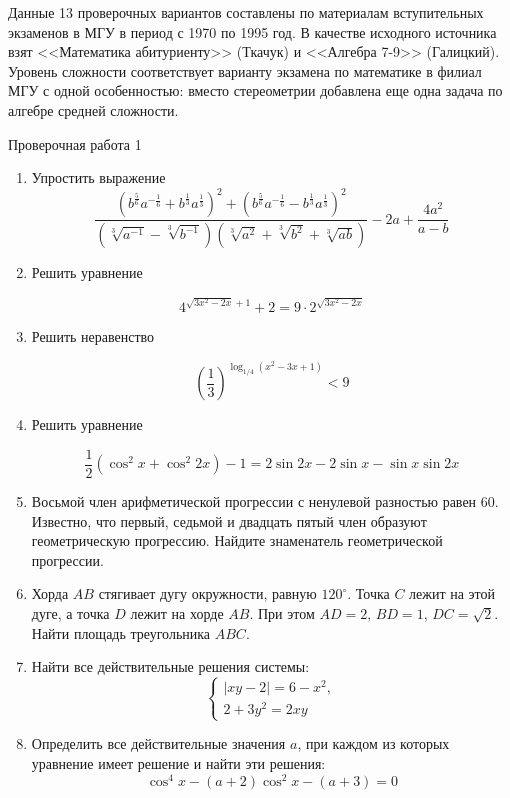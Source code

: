 \documentclass[11pt,a5paper]{report}
\begin{document}
Данные 13 проверочных вариантов составлены по материалам вступительных экзаменов в МГУ в период с 1970 по 1995 год. В качестве исходного источника взят <<Математика абитуриенту>> (Ткачук) и <<Алгебра 7-9>> (Галицкий). Уровень сложности соответствует варианту экзамена по математике в филиал МГУ с одной особенностью: вместо стереометрии добавлена еще одна задача по алгебре средней сложности.

\newpage

\begin{center}
Проверочная работа 1
\end{center}

\begin{enumerate}
\item Упростить выражение
$$
\frac{\left(b^{\frac{5}{6}} a^{-\frac{1}{6}} + b^{\frac{1}{3}} a^{\frac{1}{3}}\right)^2 + \left(b^{\frac{5}{6}} a^{-\frac{1}{6}} - b^{\frac{1}{3}} a^{\frac{1}{3}}\right)^2}
{(\sqrt[3]{a^{-1}} - \sqrt[3]{b^{-1}}) (\sqrt[3]{a^2} + \sqrt[3]{b^2} + \sqrt[3]{ab})} - 2a + \frac{4a^2}{a-b}
$$

\item Решить уравнение

$$ 4^{\sqrt{3x^2 - 2x} + 1} + 2 = 9 \cdot 2^{\sqrt{3x^2 - 2x}}$$

\item Решить неравенство

$$ \left( \frac{1}{3} \right)^{\log_{1/4} (x^2 - 3x + 1)} < 9 $$

\item Решить уравнение

$$ \frac{1}{2} (\cos^2{x} + \cos^2{2x}) - 1 = 2 \sin{2x} - 2 \sin{x} - \sin{x} \sin{2x}$$


\item Восьмой член арифметической прогрессии с ненулевой разностью равен 60. Известно, что первый, седьмой и двадцать пятый член образуют геометрическую прогрессию. Найдите знаменатель геометрической прогрессии.

\item Хорда $AB$ стягивает дугу окружности, равную $120^{\circ}$. Точка $C$ лежит на этой дуге, а точка $D$ лежит на хорде $AB$. При этом $AD = 2$, $BD = 1$, $DC = \sqrt{2}$. Найти площадь треугольника $ABC$.

\item Найти все действительные решения системы:
$$
\begin{cases}
|xy - 2| = 6 - x^2, \\
2 + 3 y^2 = 2 xy
\end{cases}
$$

\item Определить все действительные значения $a$, при каждом из которых уравнение имеет решение и найти эти решения:
$$
\cos^4{x} - (a + 2) \cos^2{x} - (a + 3) = 0
$$
\end{enumerate}
\newpage
\end{document}
